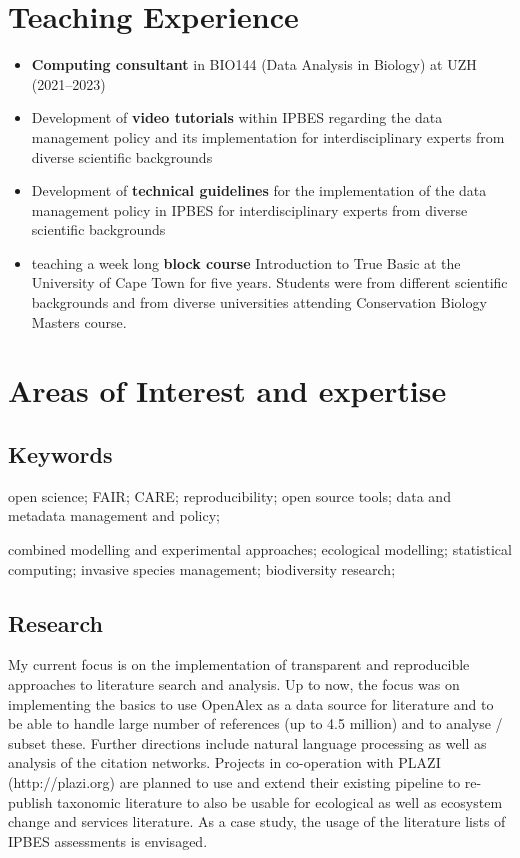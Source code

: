 \documentclass[a4paper]{article}
\begin{document}
\section{Teaching Experience}

\begin{itemize}[leftmargin=1.1in]

\item \textbf{Computing consultant} in BIO144 (Data Analysis in
	Biology) at UZH (2021--2023)

\item Development of \textbf{video tutorials} within IPBES regarding
	the data management policy and its implementation for
	interdisciplinary experts from diverse scientific backgrounds

\item Development of \textbf{technical guidelines} for the
	implementation of the data management policy in IPBES for
	interdisciplinary experts from diverse scientific backgrounds

\item teaching a week long \textbf{block course} Introduction to True
	Basic at the University of Cape Town for five years. Students were
	from different scientific backgrounds and from diverse universities
	attending Conservation Biology Masters course.


\end{itemize}

\section{Areas of Interest and expertise}

\subsection{Keywords}

    open science; FAIR; CARE; reproducibility; 
    open source tools; 
    data and metadata management and policy;
     
    combined modelling and experimental approaches;
    ecological modelling; statistical computing; 
	  invasive species management; biodiversity research;

\subsection{Research}


My current focus is on the implementation of transparent and reproducible 
	approaches to literature search and analysis. Up to now, the focus was on
	implementing the basics to use OpenAlex as a data source for literature and 
	to be able to handle large number of references (up to 4.5 million) and to 
	analyse / subset these. Further directions include natural language 
	processing as well as analysis of the citation networks. Projects in 
	co-operation with PLAZI (http://plazi.org) are planned to use and extend 
	their existing pipeline to re-publish taxonomic literature to also be usable 
	for ecological as well as ecosystem change and services literature. As a 
	case study, the usage of the literature lists of IPBES assessments is 
	envisaged.
\end{document}
